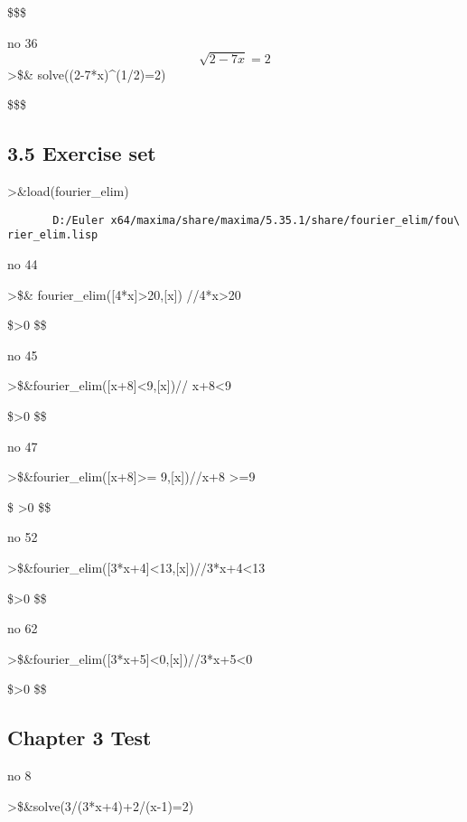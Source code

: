 \documentclass[
]{book}
\begin{document}
\$\left[ x=-4 \right] \$\$

no 36\[\sqrt{2-7x}=2\]\textgreater\$\& solve((2-7*x)\^{}(1/2)=2)

\$\left[ x=-\frac{2}{7} \right] \$\$

\subsection{3.5 Exercise set}\label{exercise-set-2}

\textgreater\&load(fourier\_elim)

\begin{verbatim}
       D:/Euler x64/maxima/share/maxima/5.35.1/share/fourier_elim/fou\
rier_elim.lisp
\end{verbatim}

no 44

\textgreater\$\& fourier\_elim({[}4*x{]}\textgreater20,{[}x{]}) //4*x\textgreater20

\$\left[ \left[ 4\,\left(x-5\right) \right] \textgreater0 \right{]} \$\$

no 45

\textgreater\$\&fourier\_elim({[}x+8{]}\textless9,{[}x{]})// x+8\textless9

\$\left[ \left[ 1-x \right] \textgreater0 \right{]} \$\$

no 47

\textgreater\$\&fourier\_elim({[}x+8{]}\textgreater= 9,{[}x{]})//x+8 \textgreater=9

\$\left[ \left[ x-1 \right] =0 \right{]} \lor \left[ \left[ x-1   \right] \textgreater0 \right{]} \$\$

no 52

\textgreater\$\&fourier\_elim({[}3*x+4{]}\textless13,{[}x{]})//3*x+4\textless13

\$\left[ \left[ -3\,\left(x-3\right) \right] \textgreater0 \right{]} \$\$

no 62

\textgreater\$\&fourier\_elim({[}3*x+5{]}\textless0,{[}x{]})//3*x+5\textless0

\$\left[ \left[ -3\,x-5 \right] \textgreater0 \right{]} \$\$

\subsection{Chapter 3 Test}\label{chapter-3-test}

no 8

\textgreater\$\&solve(3/(3*x+4)+2/(x-1)=2)
\end{document}
